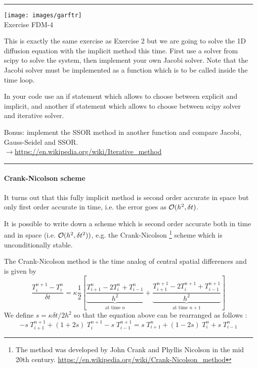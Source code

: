 \begin{center}
\begin{minipage}[t]{0.77\textwidth}
\par\noindent\rule{\textwidth}{0.4pt}

\begin{center}
\texttt{[image: images/garftr]} \\
{\color{orange}Exercise FDM-4}
\end{center}

This is exactly the same exercise as Exercise 2 but we 
are going to solve the 1D diffusion equation with the implicit method
this time. First use a solver from scipy to solve the system, then 
implement your own Jacobi solver. Note that the Jacobi solver must be 
implemented as a function which is to be called inside the time loop.

In your code use an if statement which allows to choose between 
explicit and implicit, and another if statement which allows to choose 
between scipy solver and iterative solver. 

Bonus: implement the SSOR method in another function and compare Jacobi, Gauss-Seidel and SSOR.\\
$\rightarrow$\url{https://en.wikipedia.org/wiki/Iterative_method}

\par\noindent\rule{\textwidth}{0.4pt}
\end{minipage}
\end{center}


\paragraph{Crank-Nicolson scheme} 
It turns out that this fully implicit method is second order accurate in space but 
only first order accurate in time,
i.e. the error goes as ${\cal O}(h^2,\delta t)$.   

It is possible to write down a scheme which is second order accurate both in time and in space
(i.e. ${\cal O}(h^2, \delta t^2))$, e.g. the {\color{olive}Crank-Nicolson}
\footnote{
The method was developed by John Crank and Phyllis Nicolson 
in the mid 20th century. \url{https://en.wikipedia.org/wiki/Crank-Nicolson_method}
}
scheme which is unconditionally stable. 

The Crank-Nicolson method is the time analog of central spatial differences and is given by
\begin{equation}
\frac{T_{i}^{n+1}-T_i^n}{\delta t} 
= \kappa  \frac{1}{2} \left[
\underbrace{\frac{T_{i+1}^{n} - 2T_i^{n} + T_{i-1}^{n}}{h^2}}_{\text{at time } n}
+
\underbrace{\frac{T_{i+1}^{n+1} - 2T_i^{n+1} + T_{i-1}^{n+1}}{h^2}}_{\text{at time } n+1}
\right]
\end{equation}
We define $s=\kappa \delta t/ 2h^2$ so that the equation above can be rearranged as follows :
\begin{equation}
\boxed{
-s\; T_{i+1}^{n+1} + (1+2s)\;  T_{i}^{n+1} 
-s\;  T_{i-1}^{n+1} = 
s\; T_{i+1}^{n} + (1-2s)\; T_{i}^{n} + s\; T_{i-1}^{n} 
}
\end{equation}

